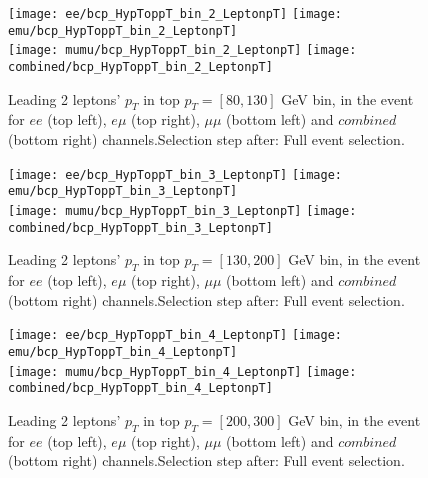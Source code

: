 \documentclass[12pt, a4paper, titlepage]{article}
\begin{document}
\clearpage
\newpage


\begin{figure}
  \texttt{[image: ee/bcp\_HypToppT\_bin\_2\_LeptonpT]}
  \texttt{[image: emu/bcp\_HypToppT\_bin\_2\_LeptonpT]}\\
  \texttt{[image: mumu/bcp\_HypToppT\_bin\_2\_LeptonpT]}
  \texttt{[image: combined/bcp\_HypToppT\_bin\_2\_LeptonpT]}
\caption{Leading 2 leptons' $p_T$ in top $p_T = [80,130]$ GeV bin, in the event for $ee$ (top left), $e\mu$ (top right), $\mu\mu$ (bottom left) and $combined$ (bottom right) channels.\newline Selection step after: Full event selection.}
\end{figure}

\clearpage
\newpage


\begin{figure}
  \texttt{[image: ee/bcp\_HypToppT\_bin\_3\_LeptonpT]}
  \texttt{[image: emu/bcp\_HypToppT\_bin\_3\_LeptonpT]}\\
  \texttt{[image: mumu/bcp\_HypToppT\_bin\_3\_LeptonpT]}
  \texttt{[image: combined/bcp\_HypToppT\_bin\_3\_LeptonpT]}
\caption{Leading 2 leptons' $p_T$ in top $p_T = [130,200]$ GeV bin, in the event for $ee$ (top left), $e\mu$ (top right), $\mu\mu$ (bottom left) and $combined$ (bottom right) channels.\newline Selection step after: Full event selection.}
\end{figure}

\clearpage
\newpage

\begin{figure}
  \texttt{[image: ee/bcp\_HypToppT\_bin\_4\_LeptonpT]}
  \texttt{[image: emu/bcp\_HypToppT\_bin\_4\_LeptonpT]}\\
  \texttt{[image: mumu/bcp\_HypToppT\_bin\_4\_LeptonpT]}
  \texttt{[image: combined/bcp\_HypToppT\_bin\_4\_LeptonpT]}
\caption{Leading 2 leptons' $p_T$ in top $p_T = [200,300]$ GeV bin, in the event for $ee$ (top left), $e\mu$ (top right), $\mu\mu$ (bottom left) and $combined$ (bottom right) channels.\newline Selection step after: Full event selection.}
\end{figure}

\clearpage
\newpage
\end{document}
